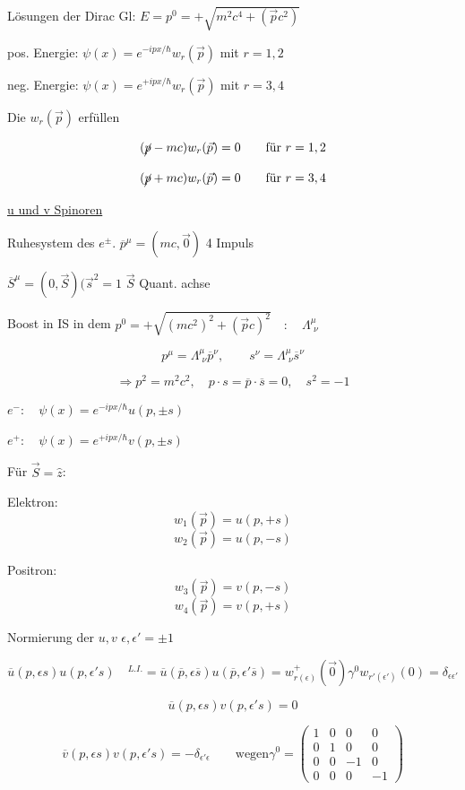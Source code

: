 Lösungen der Dirac Gl: \(E=p^0 = +\sqrt{m^2c^4+(\vec pc^2)}\)

pos. Energie: \(\psi(x) = e^{-ipx/\hbar}w_r(\vec p)\) mit \(r=1,2\)

neg. Energie: \(\psi(x) = e^{+ipx/\hbar}w_r(\vec p)\) mit \(r=3,4\)

Die \(w_r(\vec p)\) erfüllen

\[(\cancel p - mc)w_r(\vec p) = 0 \qquad\text{für } r=1,2\]

\[(\cancel p + mc)w_r(\vec p) = 0 \qquad\text{für } r=3,4\]


\underline{u und v Spinoren}


Ruhesystem des \(e^{\pm}\). \(\overline p^\mu = (mc,\vec 0)\) 4 Impuls 

\(\overline S^\mu = (0,\vec S)(\vec s^2=1\)  \(\vec S\) Quant. achse


Boost in IS in dem \(p^0 = +\sqrt{(mc^2)^2+(\vec p c)^2}\quad:\quad \Lambda^\mu_{\,\,\nu} \)

\[p^\mu = \Lambda^\mu_{\,\,\nu}\overline p^\nu, \qquad s^\nu =\Lambda^\mu_{\,\,\nu}\overline s^\nu \]

\[\Rightarrow p^2=m^2c^2, \quad p\cdot s = \overline p\cdot \overline s = 0,\quad s^2 = -1\]

\(e^-:\quad \psi(x) = e^{-ipx/\hbar}u(p,\pm s)\)

\(e^+:\quad \psi(x) = e^{+ipx/\hbar}v(p,\pm s)\)


Für \(\vec S = \hat z\):

Elektron:
\[w_1(\vec p) = u(p,+s)\]
\[w_2(\vec p) = u(p,-s)\]

Positron:
\[w_3(\vec p) = v(p,-s)\]
\[w_4(\vec p) = v(p,+s)\]

Normierung der \(u,v\) \(\epsilon,\epsilon' = \pm 1\)

\[\overline u(p,\epsilon s) u(p,\epsilon' s)\quad ^{L.I.}= \overline u(\overline p,\epsilon\overline s)  u(\overline p,\epsilon'\overline s) = w^+_{r(\epsilon)}(\vec 0)\gamma^0w_{r'(\epsilon')}(0) = \delta_{\epsilon\epsilon'}\]

\[\overline u(p,\epsilon s) v(p,\epsilon' s) = 0\]

\[\overline v(p,\epsilon s) v(p,\epsilon' s) =-\delta_{\epsilon'\epsilon}\qquad \text{wegen} \gamma^0 = \begin{pmatrix}1&0&0&0\\ 0&1&0&0\\0&0&-1&0\\0&0&0&-1\end{pmatrix} \]

